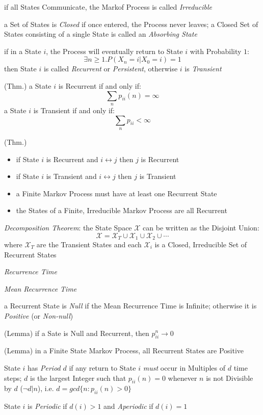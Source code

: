 if all States Communicate, the Markof Process is called \emph{Irreducible}

a Set of States is \emph{Closed} if once entered, the Process never leaves; a
Closed Set of States consisting of a single State is called an \emph{Absorbing
  State}

if in a State $i$, the Process will eventually return to State $i$ with
Probability $1$:
\[
  \exists n \geq 1 . P(X_n = i | X_0 = i) = 1
\]
then State $i$ is called \emph{Recurrent} or \emph{Persistent}, otherwise $i$ is
\emph{Transient}

(Thm.) a State $i$ is Recurrent if and only if:
\[
  \sum_n p_{ii}(n) = \infty
\]
a State $i$ is Transient if and only if:
\[
  \sum_n p_{ii} < \infty
\]

(Thm.)
\begin{itemize}
  \item if State $i$ is Recurrent and $i \leftrightarrow j$ then $j$ is
    Recurrent
  \item if State $i$ is Transient and $i \leftrightarrow j$ then $j$ is
    Transient
  \item a Finite Markov Process must have at least one Recurrent State
  \item the States of a Finite, Irreducible Markov Process are all Recurrent
\end{itemize}

\emph{Decomposition Theorem}:
the State Space $\mathcal{X}$ can be written as the Disjoint Union:
\[
  \mathcal{X} = \mathcal{X}_T \cup \mathcal{X}_1 \cup \mathcal{X}_2 \cup \cdots
\]
where $\mathcal{X}_T$ are the Transient States and each $\mathcal{X}_i$ is a
Closed, Irreducible Set of Recurrent States

\emph{Recurrence Time}

\emph{Mean Recurrence Time}

a Recurrent State is \emph{Null} if the Mean Recurrence Time is Infinite;
otherwise it is \emph{Positive} (or \emph{Non-null})

(Lemma) if a Sate is Null and Recurrent, then $p_{ii}^n \to 0$

(Lemma) in a Finite State Markov Process, all Recurrent States are Positive

State $i$ has \emph{Period} $d$ if any return to State $i$ \emph{must} occur in
Multiples of $d$ time steps; $d$ is the largest Integer such that
$p_{ii}(n) = 0$ whenever $n$ is not Divisible by $d$ ($\neg d | n$), i.e.
$d = gcd\{n : p_{ii}(n) > 0 \}$

State $i$ is \emph{Periodic} if $d(i) > 1$ and \emph{Aperiodic} if $d(i) = 1$


